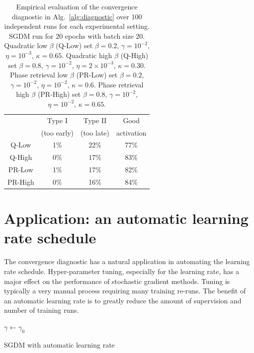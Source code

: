 \documentclass[conference]{IEEEtran}
\begin{document}
\begin{table}[t]
\caption{
Empirical evaluation of the convergence diagnostic in Alg.~\ref{alg:diagnostic} over 100 independent runs for each experimental setting.
SGDM run for $20$ epochs with batch size $20$. 
Quadratic low $\beta$ (Q-Low) set $\beta = 0.2$, $\gamma = 10^{-2}$, $\eta = 10^{-3}$, $\kappa = 0.65$. 
Quadratic high $\beta$ (Q-High) set $\beta = 0.8$, $\gamma = 10^{-2}$, $\eta = 2 \times 10^{-3}$, $\kappa = 0.30$. 
Phase retrieval low $\beta$ (PR-Low) set $\beta=0.2$, $\gamma=10^{-2}$, $\eta = 10^{-2}$, $\kappa = 0.6$. 
Phase retrieval high $\beta$ (PR-High) set $\beta=0.8$, $\gamma=10^{-2}$, $\eta = 10^{-2}$, $\kappa = 0.65$.
\vspace{-0.1in}}
\label{tab:diag_errors}
\begin{center}
\begin{tabular}{|c| c c c|} 
\hline
 & Type I & Type II & Good \\ %
 & (too early) & (too late) & activation \\
\hline%
Q-Low & 1\% & 22\% & 77\% \\ 
\hline
Q-High & 0\% & 17\% & 83\% \\ 
\hline
PR-Low & 1\% & 17\% & 82\% \\ 
\hline
PR-High & 0\% & 16\% & 84\% \\ 
\hline
\end{tabular}
\end{center}
\end{table}


\section{Application: an automatic learning rate schedule}
\label{sec:autoLR}
The convergence diagnostic has a natural application in automating the learning rate schedule.
Hyper-parameter tuning, especially for the learning rate, has a major effect on the performance of stochastic gradient methods.
Tuning is typically a very manual process requiring many training re-runs. 
The benefit of an automatic learning rate is to greatly reduce the amount of supervision and number of training runs. 

\begin{algorithm}[h]
$\gamma \gets \gamma_0$ \\
\Return{ $\theta$}
\caption{SGDM with automatic learning rate}
\label{alg:autoLR}
\end{algorithm}
\end{document}
